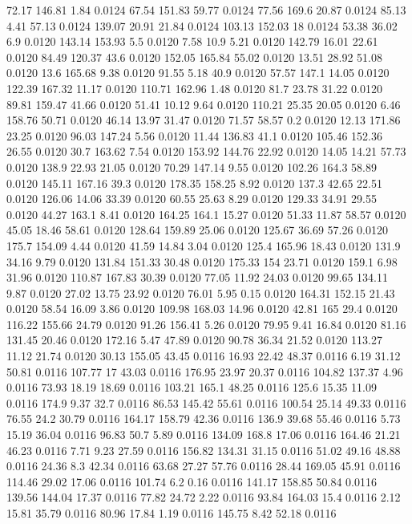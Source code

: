 72.17	146.81	1.84	0.0124
67.54	151.83	59.77	0.0124
77.56	169.6	20.87	0.0124
85.13	4.41	57.13	0.0124
139.07	20.91	21.84	0.0124
103.13	152.03	18	0.0124
53.38	36.02	6.9	0.0120
143.14	153.93	5.5	0.0120
7.58	10.9	5.21	0.0120
142.79	16.01	22.61	0.0120
84.49	120.37	43.6	0.0120
152.05	165.84	55.02	0.0120
13.51	28.92	51.08	0.0120
13.6	165.68	9.38	0.0120
91.55	5.18	40.9	0.0120
57.57	147.1	14.05	0.0120
122.39	167.32	11.17	0.0120
110.71	162.96	1.48	0.0120
81.7	23.78	31.22	0.0120
89.81	159.47	41.66	0.0120
51.41	10.12	9.64	0.0120
110.21	25.35	20.05	0.0120
6.46	158.76	50.71	0.0120
46.14	13.97	31.47	0.0120
71.57	58.57	0.2	0.0120
12.13	171.86	23.25	0.0120
96.03	147.24	5.56	0.0120
11.44	136.83	41.1	0.0120
105.46	152.36	26.55	0.0120
30.7	163.62	7.54	0.0120
153.92	144.76	22.92	0.0120
14.05	14.21	57.73	0.0120
138.9	22.93	21.05	0.0120
70.29	147.14	9.55	0.0120
102.26	164.3	58.89	0.0120
145.11	167.16	39.3	0.0120
178.35	158.25	8.92	0.0120
137.3	42.65	22.51	0.0120
126.06	14.06	33.39	0.0120
60.55	25.63	8.29	0.0120
129.33	34.91	29.55	0.0120
44.27	163.1	8.41	0.0120
164.25	164.1	15.27	0.0120
51.33	11.87	58.57	0.0120
45.05	18.46	58.61	0.0120
128.64	159.89	25.06	0.0120
125.67	36.69	57.26	0.0120
175.7	154.09	4.44	0.0120
41.59	14.84	3.04	0.0120
125.4	165.96	18.43	0.0120
131.9	34.16	9.79	0.0120
131.84	151.33	30.48	0.0120
175.33	154	23.71	0.0120
159.1	6.98	31.96	0.0120
110.87	167.83	30.39	0.0120
77.05	11.92	24.03	0.0120
99.65	134.11	9.87	0.0120
27.02	13.75	23.92	0.0120
76.01	5.95	0.15	0.0120
164.31	152.15	21.43	0.0120
58.54	16.09	3.86	0.0120
109.98	168.03	14.96	0.0120
42.81	165	29.4	0.0120
116.22	155.66	24.79	0.0120
91.26	156.41	5.26	0.0120
79.95	9.41	16.84	0.0120
81.16	131.45	20.46	0.0120
172.16	5.47	47.89	0.0120
90.78	36.34	21.52	0.0120
113.27	11.12	21.74	0.0120
30.13	155.05	43.45	0.0116
16.93	22.42	48.37	0.0116
6.19	31.12	50.81	0.0116
107.77	17	43.03	0.0116
176.95	23.97	20.37	0.0116
104.82	137.37	4.96	0.0116
73.93	18.19	18.69	0.0116
103.21	165.1	48.25	0.0116
125.6	15.35	11.09	0.0116
174.9	9.37	32.7	0.0116
86.53	145.42	55.61	0.0116
100.54	25.14	49.33	0.0116
76.55	24.2	30.79	0.0116
164.17	158.79	42.36	0.0116
136.9	39.68	55.46	0.0116
5.73	15.19	36.04	0.0116
96.83	50.7	5.89	0.0116
134.09	168.8	17.06	0.0116
164.46	21.21	46.23	0.0116
7.71	9.23	27.59	0.0116
156.82	134.31	31.15	0.0116
51.02	49.16	48.88	0.0116
24.36	8.3	42.34	0.0116
63.68	27.27	57.76	0.0116
28.44	169.05	45.91	0.0116
114.46	29.02	17.06	0.0116
101.74	6.2	0.16	0.0116
141.17	158.85	50.84	0.0116
139.56	144.04	17.37	0.0116
77.82	24.72	2.22	0.0116
93.84	164.03	15.4	0.0116
2.12	15.81	35.79	0.0116
80.96	17.84	1.19	0.0116
145.75	8.42	52.18	0.0116
